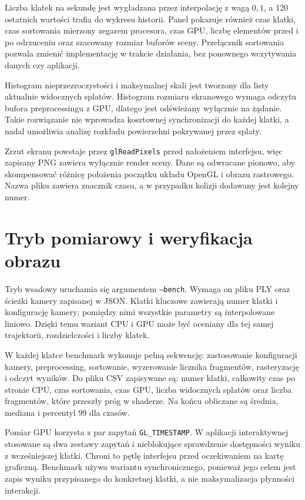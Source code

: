 Liczba klatek na sekundę jest wygładzana przez interpolację z wagą $0,1$, a 120 ostatnich wartości trafia do wykresu historii. Panel pokazuje również czas klatki, czas sortowania mierzony zegarem procesora, czas GPU, liczbę elementów przed i po odrzuceniu oraz szacowany rozmiar buforów sceny.
Przełącznik sortowania pozwala zmienić implementację w trakcie działania, bez ponownego wczytywania danych czy aplikacji.

Histogram nieprzezroczystości i maksymalnej skali jest tworzony dla listy aktualnie widocznych splatów. Histogram rozmiaru ekranowego wymaga odczytu bufora preprocessingu z GPU, dlatego jest odświeżany wyłącznie na żądanie. Takie rozwiązanie nie wprowadza kosztownej synchronizacji do każdej klatki, a nadal umożliwia analizę rozkładu powierzchni pokrywanej przez splaty.

Zrzut ekranu powstaje przez \texttt{glReadPixels} przed nałożeniem interfejsu, więc zapisany PNG zawiera wyłącznie render sceny. Dane są odwracane pionowo, aby skompensować różnicę położenia początku układu OpenGL i obrazu rastrowego. Nazwa pliku zawiera znacznik czasu, a w przypadku kolizji dodawany jest kolejny numer.

\section{Tryb pomiarowy i weryfikacja obrazu}
\label{sec:impl_pomiary}

Tryb wsadowy uruchamia się argumentem \texttt{--bench}. Wymaga on pliku PLY oraz ścieżki kamery zapisanej w JSON. Klatki kluczowe zawierają numer klatki i konfigurację kamery; pomiędzy nimi wszystkie parametry są interpolowane liniowo. Dzięki temu wariant CPU i GPU może być oceniany dla tej samej trajektorii, rozdzielczości i liczby klatek.

W każdej klatce benchmark wykonuje pełną sekwencję: zastosowanie konfiguracji kamery, preprocessing, sortowanie, wyzerowanie licznika fragmentów, rasteryzację i odczyt wyników. Do pliku CSV zapisywane są: numer klatki, całkowity czas po stronie CPU, czas sortowania, czas GPU, liczba widocznych splatów oraz liczba fragmentów, które przeszły próg w shaderze. Na końcu obliczane są średnia, mediana i percentyl 99 dla czasów.

Pomiar GPU korzysta z par zapytań \texttt{GL\_TIMESTAMP}. W aplikacji interaktywnej stosowane są dwa zestawy zapytań i nieblokujące sprawdzenie dostępności wyniku z wcześniejszej klatki. Chroni to pętlę interfejsu przed oczekiwaniem na kartę graficzną. Benchmark używa wariantu synchronicznego, ponieważ jego celem jest zapis wyniku przypisanego do konkretnej klatki, a nie maksymalizacja płynności interakcji.

